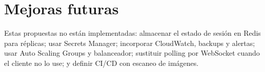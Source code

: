 \chapter{Mejoras futuras}Estas propuestas no están implementadas: almacenar el estado de sesión en Redis para réplicas; usar Secrets Manager; incorporar CloudWatch, backups y alertas; usar Auto Scaling Groups y balanceador; sustituir polling por WebSocket cuando el cliente no lo use; y definir CI/CD con escaneo de imágenes.
